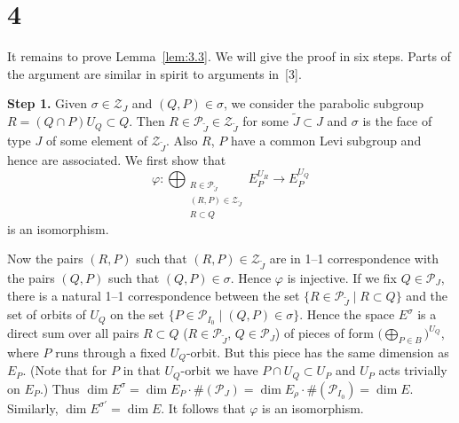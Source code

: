 \documentclass[12pt,a4paper]{article}
\theoremstyle{plain}
\theoremstyle{definition}
\theoremstyle{remark}
\newcommand{\cP}{\mathcal{P}}
\providecommand{\cP}{\mathcal{P}}
\providecommand{\cZ}{\mathcal{Z}}
\begin{document}
\section*{4}

It remains to prove Lemma~\ref{lem:3.3}. We will give the proof in six steps. Parts of the argument are similar in spirit to arguments in~[3].

\smallskip
\noindent\textbf{Step 1.} Given $\sigma \in \cZ_J$ and $(Q,P) \in \sigma$, we consider the parabolic subgroup $R = (Q \cap P)U_Q \subset Q$. Then $R \in \cP_{\tilde{J}} \in \cZ_{\tilde{J}}$ for some $\tilde{J} \subset J$ and $\sigma$ is the face of type $J$ of some element of $\cZ_{\tilde{J}}$. Also $R$, $P$ have a common Levi subgroup and hence are associated. We first show that
\begin{equation*}
\varphi \colon \bigoplus_{\substack{R \in \cP_{\tilde{J}} \\ (R,P) \in \cZ_{\tilde{J}} \\ R \subset Q}} E_P^{U_R} \longrightarrow E_P^{U_Q}
\end{equation*}
is an isomorphism.

Now the pairs $(R,P)$ such that $(R,P) \in \cZ_{\tilde{J}}$ are in 1--1 correspondence with the pairs $(Q,P)$ such that $(Q,P) \in \sigma$. Hence $\varphi$ is injective. If we fix $Q \in \cP_J$, there is a natural 1--1 correspondence between the set $\{R \in \cP_{\tilde{J}} \mid R \subset Q\}$ and the set of orbits of $U_Q$ on the set $\{P \in \cP_{I_0} \mid (Q,P) \in \sigma\}$. Hence the space $E^\sigma$ is a direct sum over all pairs $R \subset Q$ ($R \in \cP_{\tilde{J}}$, $Q \in \cP_J$) of pieces of form $\bigl(\bigoplus_{P \in B}\bigr)^{U_Q}$, where $P$ runs through a fixed $U_Q$-orbit. But this piece has the same dimension as $E_P$. (Note that for $P$ in that $U_Q$-orbit we have $P \cap U_Q \subset U_P$ and $U_P$ acts trivially on $E_P$.) Thus $\dim E^\sigma = \dim E_P \cdot \#(\cP_J) = \dim E_\rho \cdot \#(\cP_{I_0}) = \dim E$. Similarly, $\dim E^{\sigma'} = \dim E$. It follows that $\varphi$ is an isomorphism.
\end{document}
